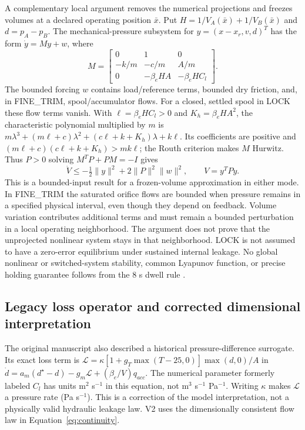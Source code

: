 \documentclass[machines,article,submit,pdftex,moreauthors]{Definitions/mdpi}
\begin{document}
A complementary local argument removes the numerical projections and freezes volumes at a declared operating position $\bar x$. Put $H=1/V_A(\bar x)+1/V_B(\bar x)$ and $d=p_A-p_B$. The mechanical-pressure subsystem for $y=(x-x_r,v,d)^T$ has the form $\dot y=My+w$, where
\begin{equation}
M=\begin{bmatrix}0&1&0\\-k/m&-c/m&A/m\\0&-\beta_e HA&-\beta_e HC_l\end{bmatrix}.
\label{eq:local-matrix}
\end{equation}
The bounded forcing $w$ contains load/reference terms, bounded dry friction, and, in FINE\_TRIM, spool/accumulator flows. For a closed, settled spool in LOCK these flow terms vanish. With $\ell=\beta_e HC_l>0$ and $K_h=\beta_e HA^2$, the characteristic polynomial multiplied by $m$ is $m\lambda^3+(m\ell+c)\lambda^2+(c\ell+k+K_h)\lambda+k\ell$. Its coefficients are positive and $(m\ell+c)(c\ell+k+K_h)>mk\ell$; the Routh criterion makes $M$ Hurwitz. Thus $P>0$ solving $M^TP+PM=-I$ gives
\begin{equation}
\dot V\le-\tfrac12\|y\|^2+2\|P\|^2\|w\|^2,\qquad V=y^TPy.
\label{eq:local-bound}
\end{equation}
This is a bounded-input result for a frozen-volume approximation in either mode. In FINE\_TRIM the saturated orifice flows are bounded when pressure remains in a specified physical interval, even though they depend on feedback. Volume variation contributes additional terms and must remain a bounded perturbation in a local operating neighborhood. The argument does not prove that the unprojected nonlinear system stays in that neighborhood. LOCK is not assumed to have a zero-error equilibrium under sustained internal leakage. No global nonlinear or switched-system stability, common Lyapunov function, or precise holding guarantee follows from the 8 s dwell rule \cite{liberzon1999,hespanha1999,goebel2009}.

\subsection{Legacy loss operator and corrected dimensional interpretation}
The original manuscript also described a historical pressure-difference surrogate. Its exact loss term is $\mathcal L=\kappa[1+g_T\max(T-25,0)]\max(d,0)/A$ in $\dot d=a_m(d^\star-d)-g_m\mathcal L+(\beta_e/V)q_{acc}$. The numerical parameter formerly labeled $C_l$ has units m$^2$ s$^{-1}$ in this equation, not m$^3$ s$^{-1}$ Pa$^{-1}$. Writing $\kappa$ makes $\mathcal L$ a pressure rate (Pa s$^{-1}$). This is a correction of the model interpretation, not a physically valid hydraulic leakage law. V2 uses the dimensionally consistent flow law in Equation~\eqref{eq:continuity}.
\end{document}
